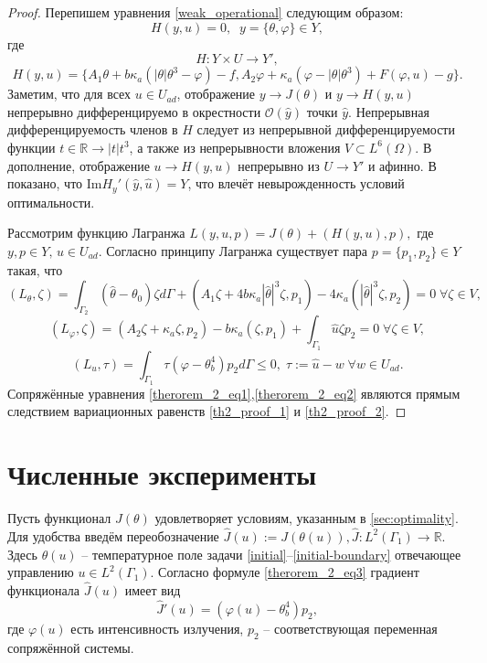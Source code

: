 \documentclass[10pt]{article}
\begin{document}
    \begin{proof}
        Перепишем уравнения \eqref{weak_operational} следующим образом:
        $$H(y,u) = 0,\;\; y = \{\theta,\varphi\} \in Y,$$
        где
        $$ H:Y \times U \to Y', $$
        $$H(y,u) =\{A_1 \theta + b \kappa_a (| \theta | \theta^3 - \varphi ) - f, A_2 \varphi + \kappa_a (\varphi - |\theta|\theta^3) + F(\varphi, u) - g \}.$$
        Заметим, что для всех $u \in U_{ad}$, отображение $y \to J(\theta) $ и $y \to H(y,u)$ непрерывно дифференцируемо в окрестности $\mathcal{O}(\hat{y})$ точки $\hat{y}$. Непрерывная дифференцируемость членов в $H$ следует из непрерывной дифференцируемости функции $t \in \mathbb{R} \to | t | t^3$, а также из непрерывности вложения  $V \subset L^6(\Omega)$.
        В дополнение, отображение $u \to H(y,u)$ непрерывно из $U \to Y'$ и афинно.
        В \cite{cheb_origin} показано, что $\text{Im}H_y'(\hat{y}, \hat{u}) = Y$, что влечёт невырожденность условий оптимальности.

        Рассмотрим функцию Лагранжа
        $L(y,u,p) = J(\theta) + (H(y,u),p),$
        где $y,p \in Y,\, u \in U_{ad}$. Согласно принципу Лагранжа \cite[Гл.2, Теорема 1.5]{theorem_proof_18} существует пара $p = \{p_1,p_2\} \in Y$ такая, что
        \begin{equation}
            \label{th2_proof_1}
            (L_\theta,\zeta) =\int_{\Gamma_2}(\hat\theta -\theta_0) \zeta d\Gamma + (A_1 \zeta + 4b\kappa_a |\hat\theta|^3 \zeta,p_1) - 4\kappa_a(|\hat\theta|^3 \zeta,p_2) = 0 \; \forall \zeta \in V,
        \end{equation}
        \begin{equation}
            \label{th2_proof_2}
            (L_\varphi, \zeta) = (A_2 \zeta + \kappa_a \zeta, p_2) - b \kappa_a(\zeta,p_1) +\int_{\Gamma_1} \hat u \zeta p_2 = 0 \; \forall \zeta \in V,
        \end{equation}
        \begin{equation}
            \label{th2_proof_3}
            (L_u,\tau) = \int_{\Gamma_1} \tau (\varphi - \theta^4_b) p_2 d\Gamma  \leq 0, \; \tau := \hat u - w \; \forall w \in U_{ad}.
        \end{equation}
        Сопряжённые уравнения \eqref{therorem_2_eq1},\eqref{therorem_2_eq2} являются прямым следствием
        вариационных равенств \eqref{th2_proof_1} и \eqref{th2_proof_2}.
    \end{proof}


    \section{Численные эксперименты}
    Пусть функционал $J(\theta)$ удовлетворяет условиям, указанным в \autoref{sec:optimality}. Для удобства введём переобозначение $\hat{J}(u):=J(\theta(u)), \hat{J}:L^2(\Gamma_1) \to \mathbb{R}$. Здесь $\theta(u)$ -- температурное поле задачи  \eqref{initial}--\eqref{initial-boundary} отвечающее управлению $u \in L^2(\Gamma_1)$.
    Согласно формуле \eqref{therorem_2_eq3} градиент функционала $\hat{J}(u)$ \cite{grenkin_13} имеет вид
    $$\hat{J}'(u)= (\varphi(u) -\theta_b^4)p_2,$$
    где $\varphi(u)$ есть интенсивность излучения, $p_2$ -- соответствующая переменная сопряжённой системы.
\end{document}
